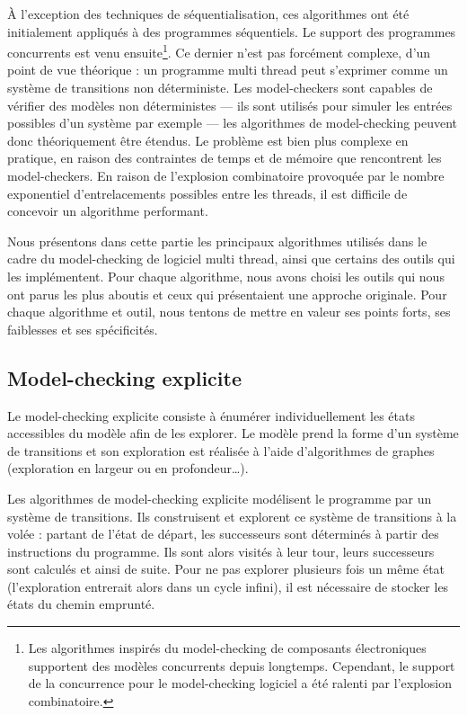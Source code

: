 À l'exception des techniques de séquentialisation, ces algorithmes ont été
initialement appliqués à des programmes séquentiels. Le support des programmes
concurrents est venu ensuite\footnote{Les algorithmes inspirés du model-checking
  de composants électroniques supportent des modèles concurrents depuis
  longtemps. Cependant, le support de la concurrence pour le model-checking
  logiciel a été ralenti par l'explosion combinatoire.}.
Ce dernier n'est pas forcément complexe, d'un point de vue théorique : un
programme multi thread peut s'exprimer comme un système de transitions
non déterministe. Les model-checkers sont capables de vérifier des modèles
non déterministes --- ils sont utilisés pour simuler les entrées possibles d'un
système par exemple --- les algorithmes de model-checking peuvent donc
théoriquement être étendus.
Le problème est bien plus complexe en pratique, en raison des contraintes de
temps et de mémoire que rencontrent les model-checkers. En raison de l'explosion
combinatoire provoquée par le nombre exponentiel d'entrelacements possibles
entre les threads, il est difficile de concevoir un algorithme performant.

Nous présentons dans cette partie les principaux algorithmes utilisés dans le
cadre du model-checking de logiciel multi thread, ainsi que certains des outils
qui les implémentent. Pour chaque algorithme, nous avons choisi les outils qui
nous ont parus les plus aboutis et ceux qui présentaient une approche originale.
Pour chaque algorithme et outil, nous tentons de mettre en valeur ses points
forts, ses faiblesses et ses spécificités.

\subsection{Model-checking explicite}

Le model-checking explicite consiste à énumérer individuellement les
états accessibles du modèle afin de les explorer. Le modèle prend la
forme d'un système de transitions et son exploration est réalisée à
l'aide d'algorithmes de graphes (exploration en largeur ou en
profondeur\dots).

Les algorithmes de model-checking explicite modélisent le programme par un
système de transitions. Ils construisent et explorent ce système de transitions
à la volée : partant de l'état de départ, les successeurs sont déterminés à
partir des instructions du programme. Ils sont alors visités à leur tour, leurs
successeurs sont calculés et ainsi de suite.
Pour ne pas explorer plusieurs fois un même état (l'exploration entrerait alors
dans un cycle infini), il est nécessaire de stocker les états du chemin
emprunté.

